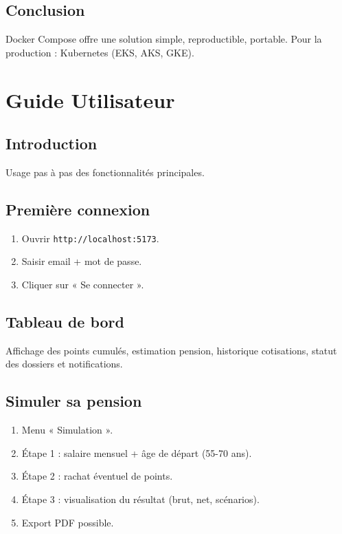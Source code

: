 \documentclass[12pt,a4paper,oneside]{report}
\begin{document}
\section{Conclusion}
Docker Compose offre une solution simple, reproductible, portable. Pour la production : Kubernetes (EKS, AKS, GKE).

\chapter{Guide Utilisateur}

\section{Introduction}
Usage pas à pas des fonctionnalités principales.

\section{Première connexion}
\begin{enumerate}
    \item Ouvrir \texttt{http://localhost:5173}.
    \item Saisir email + mot de passe.
    \item Cliquer sur « Se connecter ».
\end{enumerate}

\section{Tableau de bord}
Affichage des points cumulés, estimation pension, historique cotisations, statut des dossiers et notifications.

\section{Simuler sa pension}
\begin{enumerate}
    \item Menu « Simulation ».
    \item Étape 1 : salaire mensuel + âge de départ (55-70 ans).
    \item Étape 2 : rachat éventuel de points.
    \item Étape 3 : visualisation du résultat (brut, net, scénarios).
    \item Export PDF possible.
\end{enumerate}
\end{document}
